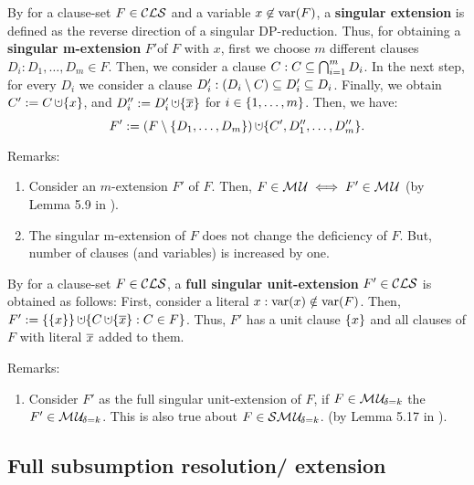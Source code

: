 \documentclass{report}
\begin{document}
\begin{defi}\label{def:singularextn}
By \cite{KullmannZhao2010Extremal} for a clause-set $F \in\mathcal{CLS}$ and a variable $x \not \in \operatorname{var}(F)$, a \textbf{singular extension} is defined as the reverse direction of a singular DP-reduction. Thus, for obtaining a \textbf{singular m-extension} $F' $of $F$ with $x$, first we choose $m$ different clauses $D_i:D_1, \dots, D_m \in F$. Then, we consider a clause  $C: C \subseteq \bigcap_{i=1}^m D_i$. In the next step, for every $D_i$ we consider a clause $D_i':(D_i \setminus C) \subseteq D_i' \subseteq D_i$. Finally, we obtain $C' := C \addcup \set{x}$, and $D_i'' := D_i' \addcup \set{\ol{x}}$ for $i \in \{ 1, \dots, m \}$. Then, we have:
  \begin{displaymath}
    F' := (F \sm \set{D_1,\dots,D_m}) \addcup \set{C', D_1'',\dots,D_m''}.
  \end{displaymath}
\end{defi}
Remarks:
  \begin{enumerate}
  \item Consider an $m$-extension $F'$ of $F$. Then, $F \in \mathcal{M\hspace{0.8pt}U} \iff F' \in \mathcal{M\hspace{0.8pt}U}$ (by Lemma 5.9 in \cite{KullmannZhao2010Extremal}).
  \item The singular m-extension of $F$ does not change the deficiency of $F$. But, number of clauses (and variables) is increased by one.
  \end{enumerate}
  
\begin{defi}\label{def:unit-ext}
By \cite{KullmannZhao2010Extremal} for a clause-set $F \in \mathcal{CLS}$, a \textbf{full singular unit-extension} $F' \in \mathcal{CLS}$ is obtained as follows: First, consider a literal $x:\operatorname{var}(x) \notin \operatorname{var}(F)$. Then, $F' := \set{\set{x}} \addcup \set{C \addcup \set{\ol{x}} : C \in F}$. Thus, $F' $ has a unit clause $\{ x \}$ and all clauses of $F$ with literal $\overline{x}$ added to them.
\end{defi}
Remarks:
  \begin{enumerate}
  \item Consider $F'$ as the full singular unit-extension of $F$, if $F \in \mathcal{M\hspace{0.8pt}U}_{\!\delta=k} $ the  $F' \in \mathcal{M\hspace{0.8pt}U}_{\!\delta=k} $. This is also true about $F \in \mathcal{S}\mathcal{M\hspace{0.8pt}U}_{\!\delta=k}$. (by Lemma 5.17 in \cite{KullmannZhao2010Extremal}).
  \end{enumerate}
\subsection{Full subsumption resolution/ extension}
\label{sec:fsr-e}  
\end{document}
